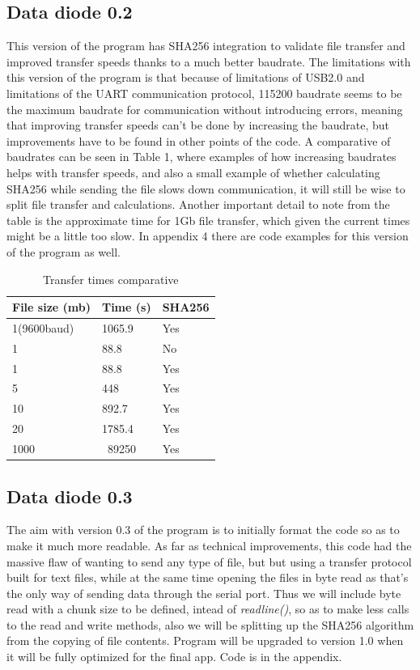 \documentclass[a4paper, 12pt]{book}
\begin{document}
\subsection{Data diode 0.2}
This version of the program has SHA256 integration to validate file transfer and improved transfer speeds thanks to a much better baudrate.
The limitations with this version of the program is that because of limitations of USB2.0 and limitations of the UART communication protocol, 115200 baudrate seems to be the maximum baudrate for communication without introducing errors, meaning that improving transfer speeds can't be done by increasing the baudrate, but improvements have to be found in other points of the code.
A comparative of baudrates can be seen in Table 1, where examples of how increasing baudrates helps with transfer speeds, and also a small example of whether calculating SHA256 while sending the file slows down communication, it will still be wise to split file transfer and calculations. Another important detail to note from the table is the approximate time for 1Gb file transfer, which given the current times might be a little too slow. In appendix 4 there are code examples for this version of the program as well.

\begin{table}[h!]
    \begin{tabular}{@{}|l|l|l|@{}}
        \toprule
        File size (mb) & Time (s) & SHA256 \\ \midrule
        1(9600baud)    & 1065.9   & Yes    \\ \midrule
        1              & 88.8     & No     \\ \midrule
        1              & 88.8     & Yes    \\ \midrule
        5              & 448      & Yes    \\ \midrule
        10             & 892.7    & Yes    \\ \midrule
        20             & 1785.4   & Yes    \\ \midrule
        1000           & ~89250   & Yes    \\ \bottomrule
    \end{tabular}
    \caption{Transfer times comparative}
    \label{tab:table 1}
\end{table}

\subsection{Data diode 0.3}
The aim with version 0.3 of the program is to initially format the code so as to make it much more readable. As far as technical improvements, this code had the massive flaw of wanting to send any type of file, but but using a transfer protocol built for text files, while at the same time opening the files in byte read as that's the only way of sending data through the serial port. Thus we will include byte read with a chunk size to be defined, intead of \textit{readline()}, so as to make less calls to the read and write methods, also we will be splitting up the SHA256 algorithm from the copying of file contents. Program will be upgraded to version 1.0 when it will be fully optimized for the final app. Code is in the appendix.
\end{document}
